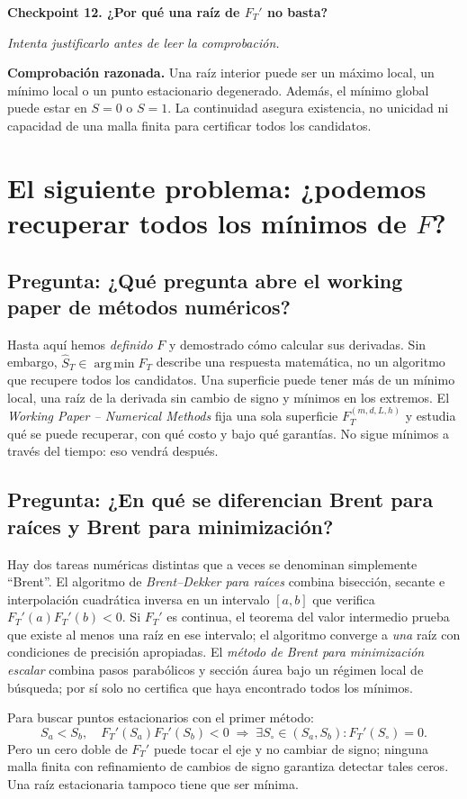 \documentclass[11pt,letterpaper,parskip=half,headings=small]{scrartcl}
\theoremstyle{definition}\newtheorem{definicion}[proposicion]{Definición}
\theoremstyle{remark}\newtheorem{observacion}[proposicion]{Observación}
\newcommand{\argmin}{\operatorname*{arg\,min}}\newcommand{\diag}{\operatorname{diag}}
\newcommand{\pregunta}[1]{\subsection{Pregunta: #1}}
\newcommand{\checkpoint}[3]{%
  \par\medskip\noindent\textbf{\color{blue!45!black}Checkpoint #1. #2}\par
  \noindent\emph{Intenta justificarlo antes de leer la comprobación.}\par
  \noindent\textbf{Comprobación razonada. }#3\par\bigskip
}
\begin{document}
\checkpoint{12}{¿Por qué una raíz de $F_T'$ no basta?}{Una raíz interior puede ser un máximo local, un mínimo local o un punto estacionario degenerado. Además, el mínimo global puede estar en $S=0$ o $S=1$. La continuidad asegura existencia, no unicidad ni capacidad de una malla finita para certificar todos los candidatos.}


\section{El siguiente problema: ¿podemos recuperar todos los mínimos de $F$?}
\pregunta{¿Qué pregunta abre el working paper de métodos numéricos?}
Hasta aquí hemos \emph{definido} $F$ y demostrado cómo calcular sus derivadas.
Sin embargo, $\widehat S_T\in\argmin F_T$ describe una respuesta matemática,
no un algoritmo que recupere todos los candidatos. Una superficie puede tener
más de un mínimo local, una raíz de la derivada sin cambio de signo y mínimos
en los extremos. El \emph{Working Paper -- Numerical Methods} fija una sola
superficie $F_T^{(m,d,L,h)}$ y estudia qué se puede recuperar, con qué costo
y bajo qué garantías. No sigue mínimos a través del tiempo: eso vendrá después.

\pregunta{¿En qué se diferencian Brent para raíces y Brent para minimización?}
Hay dos tareas numéricas distintas que a veces se denominan simplemente
``Brent''. El algoritmo de \emph{Brent--Dekker para raíces} combina
bisección, secante e interpolación cuadrática inversa en un intervalo
$[a,b]$ que verifica $F_T'(a)F_T'(b)<0$. Si $F_T'$ es continua, el
teorema del valor intermedio prueba que existe al menos una raíz en ese
intervalo; el algoritmo converge a \emph{una} raíz con condiciones de
precisión apropiadas. El \emph{método de Brent para minimización escalar}
combina pasos parabólicos y sección áurea bajo un régimen local de
búsqueda; por sí solo no certifica que haya encontrado todos los mínimos.

Para buscar puntos estacionarios con el primer método:
\[
S_a<S_b,\quad F_T'(S_a)F_T'(S_b)<0
\;\Longrightarrow\;\exists S_\circ\in(S_a,S_b):F_T'(S_\circ)=0.
\]
Pero un cero doble de $F_T'$ puede tocar el eje y no cambiar de signo;
ninguna malla finita con refinamiento de cambios de signo garantiza
detectar tales ceros. Una raíz estacionaria tampoco tiene que ser mínima.
\end{document}
